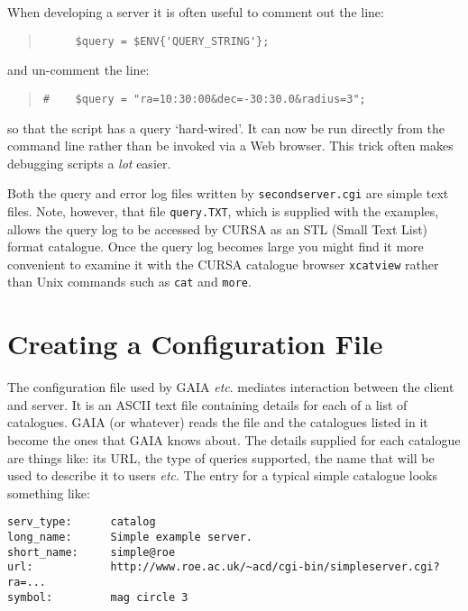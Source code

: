 \documentclass[twoside,11pt]{article}
\newcommand{\xref}[3]{#1}
\newcommand{\xlabel}[1]{}
\renewcommand{\_}{\texttt{\symbol{95}}}
\begin{document}
When developing a server it is often useful to comment out the line:

\begin{quote}
\begin{verbatim}
     $query = $ENV{'QUERY_STRING'};
\end{verbatim}
\end{quote}

and un-comment the line:

\begin{quote}
\begin{verbatim}
#    $query = "ra=10:30:00&dec=-30:30.0&radius=3";
\end{verbatim}
\end{quote}

so that the script has a query `hard-wired'.  It can now be run directly
from the command line rather than be invoked via a Web browser.  This
trick often makes debugging scripts a {\it lot}\/ easier.

Both the query and error log files written by {\tt secondserver.cgi}
are simple text files.  Note, however, that file {\tt query.TXT}, which
is supplied with the examples, allows the query log to be accessed by
\xref{CURSA}{sun190}{}\cite{SUN190} as an STL (Small Text List) format
catalogue.  Once the query log becomes large you might find it more
convenient to examine it with the CURSA catalogue browser {\tt xcatview}
rather than Unix commands such as {\tt cat} and {\tt more}.


\section{\xlabel{CONFIG_T}\label{CONFIG_T}Creating a Configuration File}

The configuration file used by \xref{GAIA}{sun214}{} \emph{etc}. mediates
interaction between the client and server.  It is an ASCII text file
containing details for each of a list of catalogues.  GAIA (or whatever)
reads the file and the catalogues listed in it become the ones that GAIA
knows about.  The details supplied for each catalogue are things like:
its URL, the type of queries supported, the name that will be used to
describe it to users \emph{etc}.  The entry for a typical simple catalogue
looks something like:

\begin{verbatim}
serv_type:      catalog
long_name:      Simple example server.
short_name:     simple@roe
url:            http://www.roe.ac.uk/~acd/cgi-bin/simpleserver.cgi?ra=...
symbol:         mag circle 3
\end{verbatim}
\end{document}
